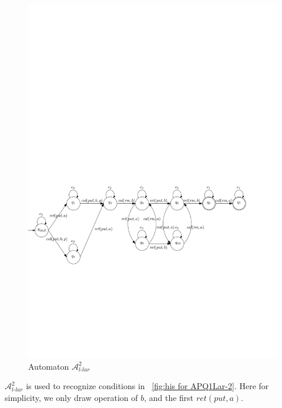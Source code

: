 \begin{figure}[htbp]
  \centering
  \includegraphics[width=1 \textwidth]{figures/PIC_AUTO_PQ1Lar-prpr.pdf}
  \caption{Automaton $\mathcal{A}_{\textit{l-lar}}^2$}
  \label{fig:automata APQ1Lar-2}
\end{figure}


$\mathcal{A}_{\textit{l-lar}}^2$ is used to recognize conditions in \figurename~\ref{fig:his for APQ1Lar-2}. Here for simplicity, we only draw operation of $b$, and the first $\textit{ret}(\textit{put},a)$.


